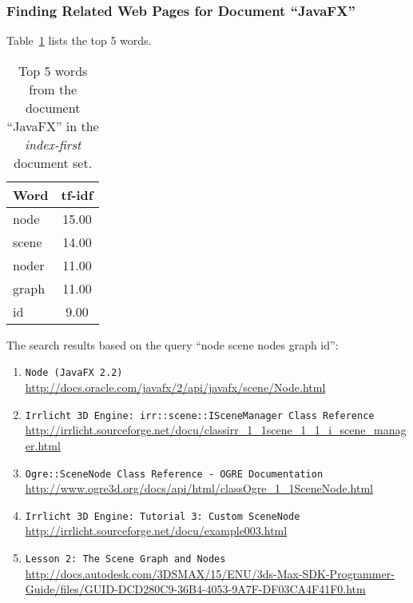 \subsubsection{Finding Related Web Pages for Document ``JavaFX''}
\label{subsubsec:no-javafx}

Table~\ref{tab:topWords-no-javafx} lists the top 5 words.
\begin{table}[H]
\centering
\begin{tabular}{|l|c|}
\hline\hline
    Word & tf-idf \\
\hline
    node & 15.00 \\
    scene & 14.00 \\
    noder & 11.00 \\
    graph & 11.00 \\
    id & 9.00 \\
\hline\hline
\end{tabular}
\caption{Top 5 words from the document ``JavaFX'' in the \textit{index-first} document set.}
\label{tab:topWords-no-javafx}
\end{table}

The search results based on the query ``node scene nodes graph id'':

\begin{enumerate}
\item
    \verb|Node (JavaFX 2.2)| \\
    \url{http://docs.oracle.com/javafx/2/api/javafx/scene/Node.html}
\item
    \verb|Irrlicht 3D Engine: irr::scene::ISceneManager Class Reference| \\
    \url{http://irrlicht.sourceforge.net/docu/classirr_1_1scene_1_1_i_scene_manager.html}
\item
    \verb|Ogre::SceneNode Class Reference - OGRE Documentation| \\
    \url{http://www.ogre3d.org/docs/api/html/classOgre_1_1SceneNode.html}
\item
    \verb|Irrlicht 3D Engine: Tutorial 3: Custom SceneNode| \\
    \url{http://irrlicht.sourceforge.net/docu/example003.html}
\item
    \verb|Lesson 2: The Scene Graph and Nodes| \\
    \url{http://docs.autodesk.com/3DSMAX/15/ENU/3ds-Max-SDK-Programmer-Guide/files/GUID-DCD280C9-36B4-4053-9A7F-DF03CA4F41F0.htm}
\end{enumerate}


